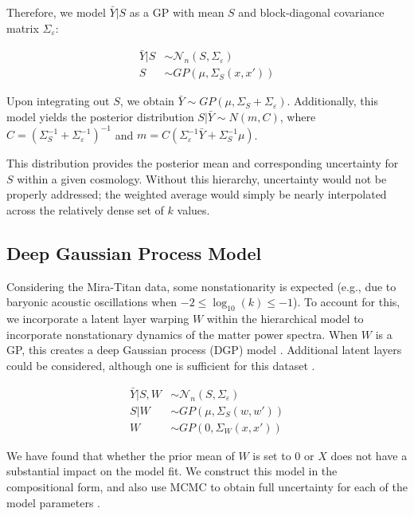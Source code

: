 \documentclass[11pt]{article}
\begin{document}
Therefore, we model $\bar Y|S$ as a GP with mean $S$ and block-diagonal covariance matrix $\Sigma_\varepsilon$:

$$
\begin{aligned}
\bar Y|S &\sim \mathcal{N}_n(S,\Sigma_\varepsilon) \\
S &\sim GP\left(\mu, \Sigma_S(x,x')\right)
\end{aligned}
$$

Upon integrating out $S$, we obtain $\bar Y \sim GP(\mu, \Sigma_S+\Sigma_\varepsilon)$. Additionally, this model yields the posterior distribution $S|\bar Y \sim N(m, C)$, where $C=\left(\Sigma_S^{-1}+\Sigma_\varepsilon^{-1}\right)^{-1}$ and $m=C\left(\Sigma_\varepsilon^{-1}\bar Y+\Sigma_S^{-1}\mu\right)$. 

This distribution provides the posterior mean and corresponding uncertainty for $S$ within a given cosmology. Without this hierarchy, uncertainty would not be properly addressed; the weighted average would simply be nearly interpolated across the relatively dense set of $k$ values.

\subsection{Deep Gaussian Process Model}

Considering the Mira-Titan data, some nonstationarity is expected (e.g., due to baryonic acoustic oscillations when $-2 \leq \log_{10}(k) \leq -1$). To account for this, we incorporate a latent layer warping $W$ within the hierarchical model to incorporate nonstationary dynamics of the matter power spectra. When $W$ is a GP, this creates a deep Gaussian process (DGP) model \citep{damianou2013deep}. Additional latent layers could be considered, although one is sufficient for this dataset \citep{dunlop2018deep}.

$$
\begin{aligned}
\bar Y|S,W &\sim \mathcal{N}_n(S,\Sigma_\varepsilon) \\
S|W &\sim GP\left(\mu, \Sigma_S(w,w')\right) \\
W &\sim GP\left(0, \Sigma_W(x,x')\right)
\end{aligned}
$$

We have found that whether the prior mean of $W$ is set to 0 or $X$ \citep[which would indicate stationarity apriori, ][]{schmidt2003bayesian} does not have a substantial impact on the model fit. We construct this model in the compositional form, and also use MCMC to obtain full uncertainty for each of the model parameters \citep{sauer2023active}.
\end{document}
